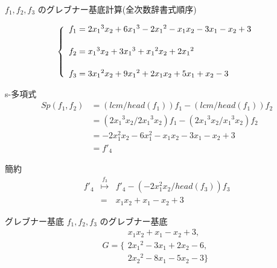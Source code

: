 \begin{frame}
\begin{exampleblock}{$f_1,f_2,f_3$ のグレブナー基底計算(全次数辞書式順序)}

\[ \left\{
\begin{array}{l}
f_1 = 2{x_1}^3x_2 +6{x_1}^3-2{x_1}^2-x_1x_2-3x_1-x_2+3\vspace{.2in}\\
f_2 = {x_1}^3x_2 + 3{x_1}^3 + {x_1}^2x_2 + 2{x_1}^2\vspace{.2in}\\
f_3 = 3{x_1}^2x_2 + 9{x_1}^2 + 2x_1x_2 + 5x_1 + x_2 -3
\end{array}
\right. \]
\end{exampleblock}

\begin{exampleblock}{s-多項式}
\[
\begin{array}{ll} 
Sp(f_1,f_2) &= ( lcm / head(f_1) ) f_1 - ( lcm / head(f_1)) f_2 \\
            &= ( 2{x_1}^3x_2 / 2{x_1}^3x_2 ) f_1 - ( 2{x_1}^3x_2 / {x_1}^3x_2 ) f_2 \\
	    &= -2x_1^2 x_2 -6x_1^2 -x_1 x_2 - 3x_1 -x_2 +3 \\
	    &= f'_4
\end{array}
\]
\end{exampleblock}

\begin{exampleblock}{簡約}
\[
\begin{array}{lll}
f'_4 & \stackrel{f_3}{\longmapsto} & f'_4 - (-2x_1^2 x_2 /{head(f_3)})f_3 \\
     & = & x_1 x_2+ x_1 -x_2 +3
\end{array}
\]
\end{exampleblock}
\end{frame}

\begin{frame}
\begin{exampleblock}{グレブナー基底}
$f_1,f_2,f_3$ のグレブナー基底
\[ 
	G = \{
 \begin{array}{l}
  x_1 x_2 + x_1- x_2 + 3, \\
  2{x_1}^2 - 3 x_1 + 2 x_2 - 6, \\
  2{x_2}^2 - 8 x_1 - 5 x_2 -3 \}
 \end{array} 
\]
\end{exampleblock}
\end{frame}

